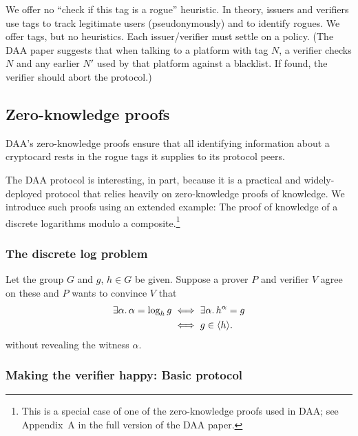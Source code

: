 We offer no “check if this tag is a rogue” heuristic. In
theory, issuers and verifiers use tags to track legitimate
users (pseudonymously) and to identify rogues. We offer tags,
but no heuristics. Each issuer/verifier must settle on a
policy. (The DAA paper suggests that when talking to a
platform with tag $N$, a verifier checks $N$ and any earlier $N'$
used by that platform against a blacklist. If found, the
verifier should abort the protocol.)

\subsection{Zero-knowledge proofs}

\begin{comment}
	\emph{PDS:}
	Security property:  Unforgeability (by reduction to the
	flexible RSA problem).

	Alleged security properties: Satistical witness
	indistinguishable and soundness (by reduction to the flexible
	RSA problem in the random oracle model).
\end{comment}
\fi

DAA's zero-knowledge proofs ensure that all identifying information
about a cryptocard rests in the rogue tags it supplies to its protocol peers.

The DAA protocol is interesting, in part, because it is a practical
and widely-deployed protocol that relies heavily on zero-knowledge
proofs of knowledge.
We introduce such proofs using an extended example: The
proof of knowledge of a discrete logarithms modulo a
composite.\footnote{%
	This is a special case of one of the zero-knowledge proofs used in DAA;
	see Appendix~A in the full version of the DAA paper.}

\subsubsection{The discrete log problem}

Let the group $G$ and $g$, $h \in G$ be given.
Suppose a prover $P$ and
verifier $V$ agree on these and $P$ wants to convince $V$ that
\begin{align*}
\exists \alpha.\, \alpha = \log_h g &\iff \exists \alpha.\, h^\alpha = g \\
	&\iff g \in \langle{h}\rangle.
\end{align*}
without revealing the witness $\alpha$.

\subsubsection{Making the verifier happy: Basic protocol}

